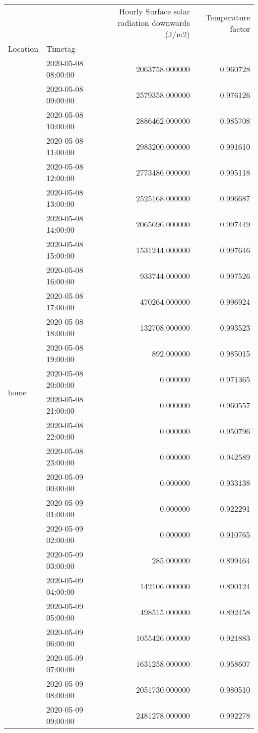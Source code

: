\begin{tabular}{llrr}
 &  & Hourly Surface solar radiation downwards (J/m2) & Temperature factor \\
Location & Timetag &  &  \\
\multirow[c]{1186}{*}{home} & 2020-05-08 08:00:00 & 2063758.000000 & 0.960728 \\
 & 2020-05-08 09:00:00 & 2579358.000000 & 0.976126 \\
 & 2020-05-08 10:00:00 & 2886462.000000 & 0.985708 \\
 & 2020-05-08 11:00:00 & 2983200.000000 & 0.991610 \\
 & 2020-05-08 12:00:00 & 2773486.000000 & 0.995118 \\
 & 2020-05-08 13:00:00 & 2525168.000000 & 0.996687 \\
 & 2020-05-08 14:00:00 & 2065696.000000 & 0.997449 \\
 & 2020-05-08 15:00:00 & 1531244.000000 & 0.997646 \\
 & 2020-05-08 16:00:00 & 933744.000000 & 0.997526 \\
 & 2020-05-08 17:00:00 & 470264.000000 & 0.996924 \\
 & 2020-05-08 18:00:00 & 132708.000000 & 0.993523 \\
 & 2020-05-08 19:00:00 & 892.000000 & 0.985015 \\
 & 2020-05-08 20:00:00 & 0.000000 & 0.971365 \\
 & 2020-05-08 21:00:00 & 0.000000 & 0.960557 \\
 & 2020-05-08 22:00:00 & 0.000000 & 0.950796 \\
 & 2020-05-08 23:00:00 & 0.000000 & 0.942589 \\
 & 2020-05-09 00:00:00 & 0.000000 & 0.933138 \\
 & 2020-05-09 01:00:00 & 0.000000 & 0.922291 \\
 & 2020-05-09 02:00:00 & 0.000000 & 0.910765 \\
 & 2020-05-09 03:00:00 & 285.000000 & 0.899464 \\
 & 2020-05-09 04:00:00 & 142106.000000 & 0.890124 \\
 & 2020-05-09 05:00:00 & 498515.000000 & 0.892458 \\
 & 2020-05-09 06:00:00 & 1055426.000000 & 0.921883 \\
 & 2020-05-09 07:00:00 & 1631258.000000 & 0.958607 \\
 & 2020-05-09 08:00:00 & 2051730.000000 & 0.980510 \\
 & 2020-05-09 09:00:00 & 2481278.000000 & 0.992278 \\

\end{tabular}
